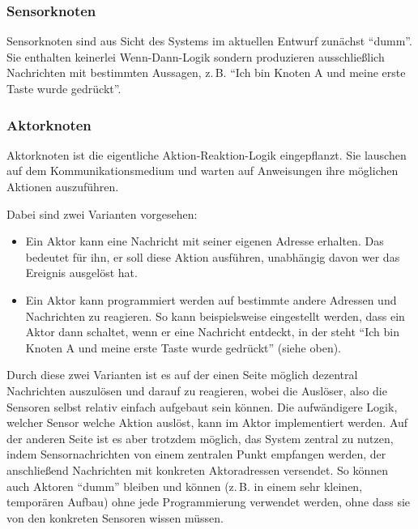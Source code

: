 \documentclass{IEEEtran}
\begin{document}
        \subsubsection{Sensorknoten}\label{Sensorknoten}
            Sensorknoten sind aus Sicht des Systems im aktuellen Entwurf
            zunächst \enquote{dumm}. Sie enthalten keinerlei Wenn-Dann-Logik
            sondern produzieren ausschließlich Nachrichten mit bestimmten
            Aussagen, z.\,B. \enquote{Ich bin Knoten A und meine erste Taste
            wurde gedrückt}.
        \subsubsection{Aktorknoten}\label{Aktorknoten}
            Aktorknoten ist die eigentliche Aktion-Reaktion-Logik eingepflanzt.
            Sie lauschen auf dem Kommunikationsmedium und warten auf Anweisungen
            ihre möglichen Aktionen auszuführen.

            Dabei sind zwei Varianten vorgesehen:
            \begin{itemize}
                \item Ein Aktor kann eine Nachricht mit seiner eigenen Adresse
                    erhalten. Das bedeutet für ihn, er soll diese Aktion
                    ausführen, unabhängig davon wer das Ereignis ausgelöst hat.
                \item Ein Aktor kann programmiert werden auf bestimmte andere
                    Adressen und Nachrichten zu reagieren.
                    So kann beispielsweise eingestellt werden, dass ein Aktor
                    dann schaltet, wenn er eine Nachricht entdeckt, in der steht
                    \enquote{Ich bin Knoten A und meine erste Taste
                    wurde gedrückt} (siehe oben).
            \end{itemize}

            Durch diese zwei Varianten ist es auf der einen Seite möglich
            dezentral Nachrichten auszulösen und darauf zu reagieren, wobei
            die Auslöser, also die Sensoren selbst relativ einfach aufgebaut
            sein können. Die aufwändigere Logik, welcher Sensor welche Aktion
            auslöst, kann im Aktor implementiert werden.
            Auf der anderen Seite ist es aber trotzdem möglich, das System
            zentral zu nutzen, indem Sensornachrichten von einem zentralen
            Punkt empfangen werden, der anschließend Nachrichten mit konkreten
            Aktoradressen versendet. So können auch Aktoren \enquote{dumm}
            bleiben und können (z.\,B. in einem sehr kleinen, temporären Aufbau)
            ohne jede Programmierung verwendet werden, ohne dass sie von den
            konkreten Sensoren wissen müssen.
\end{document}
